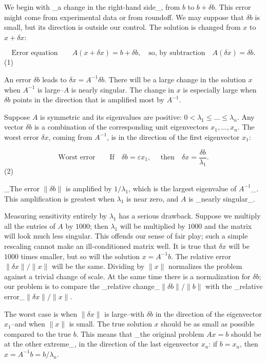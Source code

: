We begin with _a change in the right-hand side_, from \(b\) to \(b+\delta b\). This error might come from experimental data or from roundoff. We may suppose that \(\delta b\) is small, but its direction is outside our control. The solution is changed from \(x\) to \(x+\delta x\):

\[\text{Error equation}\qquad A(x+\delta x)=b+\delta b,\quad\text{so, by subtraction} \quad A(\delta x)=\delta b.\] (1)

An error \(\delta b\) leads to \(\delta x=A^{-1}\delta b\). There will be a large change in the solution \(x\) when \(A^{-1}\) is large--\(A\) is nearly singular. The change in \(x\) is especially large when \(\delta b\) points in the direction that is amplified most by \(A^{-1}\).

Suppose \(A\) is symmetric and its eigenvalues are positive: \(0<\lambda_{1}\leq\dots\leq\lambda_{n}\). Any vector \(\delta b\) is a combination of the corresponding unit eigenvectors \(x_{1},\dots,x_{n}\). The worst error \(\delta x\), coming from \(A^{-1}\), is in the direction of the first eigenvector \(x_{1}\):

\[\text{Worst error}\qquad\text{If}\quad\delta b=\varepsilon x_{1},\quad\text{ then}\quad\delta x=\frac{\delta b}{\lambda_{1}}.\] (2)

_The error \(\|\delta b\|\) is amplified by \(1/\lambda_{1}\), which is the largest eigenvalue of \(A^{-1}\)_. This amplification is greatest when \(\lambda_{1}\) is near zero, and \(A\) is _nearly singular_.

Measuring sensitivity entirely by \(\lambda_{1}\) has a serious drawback. Suppose we multiply all the entries of \(A\) by \(1000\); then \(\lambda_{1}\) will be multiplied by \(1000\) and the matrix will look much less singular. This offends our sense of fair play; such a simple rescaling cannot make an ill-conditioned matrix well. It is true that \(\delta x\) will be \(1000\) times smaller, but so will the solution \(x=A^{-1}b\). The relative error \(\|\delta x\|/\|x\|\) will be the same. Dividing by \(\|x\|\) normalizes the problem against a trivial change of scale. At the same time there is a normalization for \(\delta b\); our problem is to compare the _relative change_\(\|\delta b\|/\|b\|\) with the _relative error_\(\|\delta x\|/\|x\|\).

The worst case is when \(\|\delta x\|\) is large--with \(\delta b\) in the direction of the eigenvector \(x_{1}\)--and when \(\|x\|\) is small. The true solution \(x\) should be as small as possible compared to the true \(b\). This means that _the original problem \(Ax=b\) should be at the other extreme_, in the direction of the last eigenvector \(x_{n}\): if \(b=x_{n}\), then \(x=A^{-1}b=b/\lambda_{n}\).

